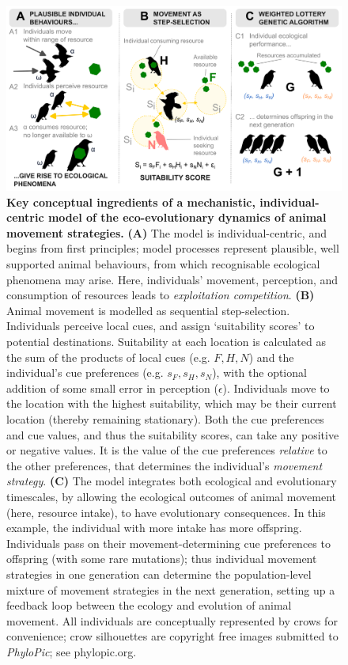 \begin{figure}
  \centering
  \includegraphics[width=0.75\linewidth]{figures/introduction/fig_concept.png}
  \caption{
      \textbf{Key conceptual ingredients of a mechanistic, individual-centric model of the eco-evolutionary dynamics of animal movement strategies.}
      \textbf{(A)} The model is individual-centric, and begins from first principles; model processes represent plausible, well supported animal behaviours, from which recognisable ecological phenomena may arise. Here, individuals' movement, perception, and consumption of resources leads to \textit{exploitation competition}.
      \textbf{(B)} Animal movement is modelled as sequential step-selection. Individuals perceive local cues, and assign `suitability scores' to potential destinations. Suitability at each location is calculated as the sum of the products of local cues (e.g. $F, H, N$) and the individual's cue preferences (e.g. $s_F, s_H, s_N$), with the optional addition of some small error in perception ($\epsilon$). Individuals move to the location with the highest suitability, which may be their current location (thereby remaining stationary). Both the cue preferences and cue values, and thus the suitability scores, can take any positive or negative values. It is the value of the cue preferences \textit{relative} to the other preferences, that determines the individual's \textit{movement strategy}.
      \textbf{(C)} The model integrates both ecological and evolutionary timescales, by allowing the ecological outcomes of animal movement (here, resource intake), to have evolutionary consequences. In this example, the individual with more intake has more offspring. Individuals pass on their movement-determining cue preferences to offspring (with some rare mutations); thus individual movement strategies in one generation can determine the population-level mixture of movement strategies in the next generation, setting up a feedback loop between the ecology and evolution of animal movement.
      All individuals are conceptually represented by crows for convenience; crow silhouettes are copyright free images submitted to \textit{PhyloPic}; see phylopic.org.
  }
  \label{fig:intro_concepts}
\end{figure}

